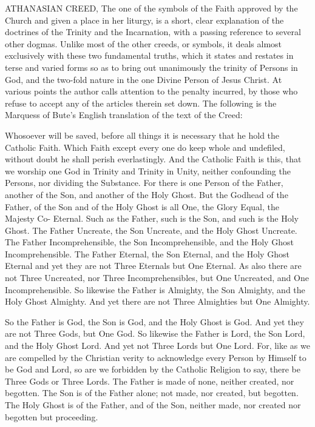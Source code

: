 ATHANASIAN CREED, The one of the symbols of the Faith approved by the Church and
given a place in her liturgy, is a short, clear explanation of the doctrines of the Trinity and the
Incarnation, with a passing reference to several other dogmas. Unlike most of the other
creeds, or symbols, it deals almost exclusively with these two fundamental truths, which it
states and restates in terse and varied forms so as to bring out unanimously the trinity of
Persons in God, and the two-fold nature in the one Divine Person of Jesus Christ. At various
points the author calls attention to the penalty incurred, by those who refuse to accept any of
the articles therein set down. The following is the Marquess of Bute's English translation of
the text of the Creed:

Whosoever will be saved, before all things it is necessary that he hold the Catholic Faith.
Which Faith except every one do keep whole and undefiled, without doubt he shall perish
everlastingly. And the Catholic Faith is this, that we worship one God in Trinity and Trinity
in Unity, neither confounding the Persons, nor dividing the Substance. For there is one
Person of the Father, another of the Son, and another of the Holy Ghost. But the Godhead of
the Father, of the Son and of the Holy Ghost is all One, the Glory Equal, the Majesty Co-
Eternal. Such as the Father, such is the Son, and such is the Holy Ghost. The Father
Uncreate, the Son Uncreate, and the Holy Ghost Uncreate. The Father Incomprehensible, the
Son Incomprehensible, and the Holy Ghost Incomprehensible. The Father Eternal, the Son
Eternal, and the Holy Ghost Eternal and yet they are not Three Eternals but One Eternal. As
also there are not Three Uncreated, nor Three Incomprehensibles, but One Uncreated, and
One Incomprehensible. So likewise the Father is Almighty, the Son Almighty, and the Holy
Ghost Almighty. And yet there are not Three Almighties but One Almighty.

So the Father is God, the Son is God, and the Holy Ghost is God. And yet they are not Three
Gods, but One God. So likewise the Father is Lord, the Son Lord, and the Holy Ghost Lord.
And yet not Three Lords but One Lord. For, like as we are compelled by the Christian verity
to acknowledge every Person by Himself to be God and Lord, so are we forbidden by the
Catholic Religion to say, there be Three Gods or Three Lords. The Father is made of none,
neither created, nor begotten. The Son is of the Father alone; not made, nor created, but
begotten. The Holy Ghost is of the Father, and of the Son, neither made, nor created nor
begotten but proceeding.

